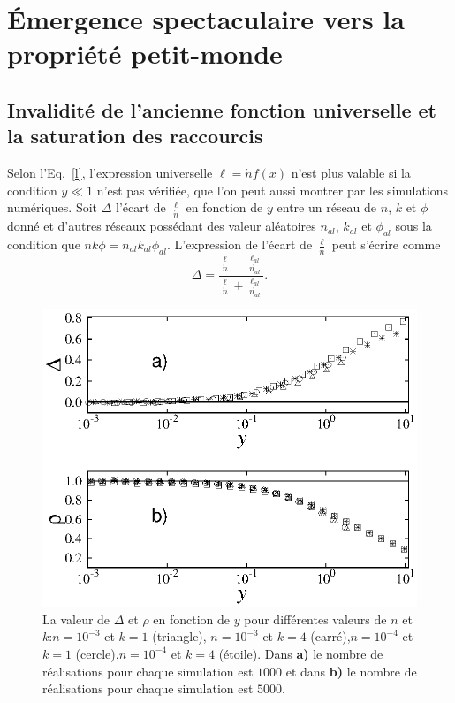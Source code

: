 \section{Émergence spectaculaire vers la propriété petit-monde}
\subsection{Invalidité de l'ancienne fonction universelle et la saturation des raccourcis}
Selon l'Eq.~\eqref{l}, l'expression universelle $\ell=\acute{n}f(x)$
n'est plus valable si la condition $y\ll 1$ n'est pas vérifiée, que l'on peut aussi montrer par les simulations numériques. Soit $\Delta$ l'écart de $\frac{\ell}{\acute{n}}$ en fonction
de $y$ entre un réseau de $n$, $k$ et $\phi$ donné et d'autres réseaux possédant des valeur aléatoires $n_{al}$, $k_{al}$ 
et $\phi_{al}$ sous la condition que $nk\phi=n_{al}k_{al}\phi_{al}$. L'expression de l'écart de $\frac{\ell}{\acute{n}}$  peut s'écrire  comme
\begin{equation}
\Delta=\frac{\frac{\ell}{\acute{n}}-\frac{\ell_{al}}{\acute{n_{al}}}}{\frac{\ell}{\acute{n}}+\frac{\ell_{al}}{\acute{n_{al}}}}.
\end{equation}

\begin{figure}[h!]
	\centering
	\includegraphics[scale=0.95,angle=0]{./figures/fig3-4}
	\caption{La valeur de $\Delta$ et $\rho$ en fonction de $y$ pour différentes valeurs de $n$ et $k$:$n=10^{-3}$ et $k=1$ (triangle), $n=10^{-3}$ et	$k=4$ (carré),$n=10^{-4}$ et $k=1$ (cercle),$n=10^{-4}$ et $k=4$ (étoile). Dans   \textbf{a)} le nombre de réalisations pour chaque simulation est $1000$ et dans \textbf{b)} le nombre de réalisations pour chaque simulation est $5000$.}
	\label{def}
\end{figure}

